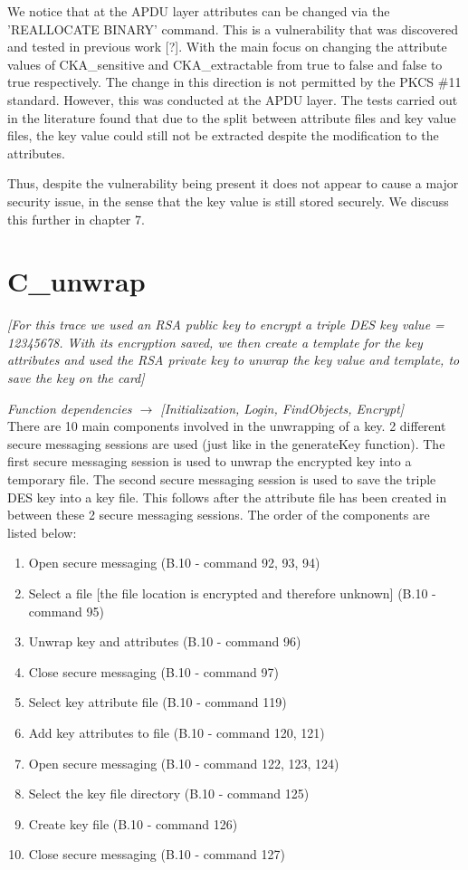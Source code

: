 \documentclass[bsc,frontabs,twoside,singlespacing,parskip,deptreport]{infthesis}     %
\begin{document}
We notice that at the APDU layer attributes can be changed  via the 'REALLOCATE BINARY' command. This is a vulnerability that was discovered and tested in previous work [?]. With the main focus on changing the attribute values of CKA\_sensitive and CKA\_extractable from true to false and false to true respectively. The change in this direction is not permitted by the PKCS \#11 standard. However, this was conducted at the APDU layer. The tests carried out in the literature found that due to the split between attribute files and key value files, the key value could still not be extracted despite the modification to the attributes.

Thus, despite the vulnerability being present it does not appear to cause a major security issue, in the sense that the key value is still stored securely. We discuss this further in chapter 7.


\section{C\_unwrap}
\textit{[For this trace we used an RSA public key to encrypt a triple DES key value = 12345678. With its encryption saved, we then create a template for the key attributes and used the RSA private key to unwrap the key value and template, to save the key on the card]}

\textit{Function dependencies $\rightarrow$ [Initialization, Login, FindObjects, Encrypt]}\\


There are 10 main components involved in the unwrapping of a key. 2 different secure messaging sessions are used (just like in the generateKey function). The first secure messaging session is used to unwrap the encrypted key into a temporary file. The second secure messaging session is used to save the triple DES key into a key file. This follows after the attribute file has been created in between these 2 secure messaging sessions. The order of the components are listed below:\\

\begin{enumerate}
\item Open secure messaging (B.10 - command 92, 93, 94)
\item Select a file [the file location is encrypted and therefore unknown] (B.10 - command 95)
\item Unwrap key and attributes (B.10 - command 96)
\item Close secure messaging (B.10 - command 97)
\item Select key attribute file (B.10 - command 119)
\item Add key attributes to file (B.10 - command 120, 121)
\item Open secure messaging (B.10 - command 122, 123, 124)
\item Select the key file directory (B.10 - command 125)
\item Create key file (B.10 - command 126)
\item Close secure messaging (B.10 - command 127)\\
\end{enumerate}
\end{document}
